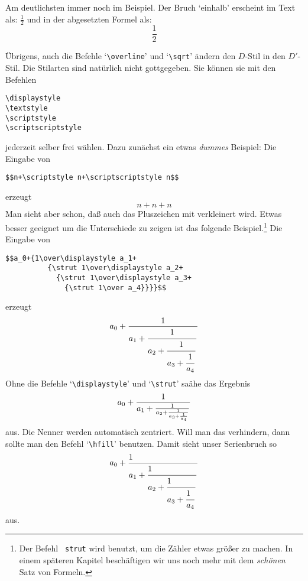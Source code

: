 Am deutlichsten immer noch im Beispiel. Der 
Bruch `einhalb' erscheint
im Text als: $\frac{1}{2}$ und in der abgesetzten
Formel
als:\[\frac{1}{2}\]

\"Ubrigens, auch die Befehle 
`\verb|\overline|' und `\verb|\sqrt|'
\"andern den $D$-Stil in den $D'$-Stil. Die Stilarten sind nat\"urlich
nicht gottgegeben. Sie k\"onnen sie mit den Befehlen
\begin{verbatim}
\displaystyle
\textstyle
\scriptstyle
\scriptscriptstyle
\end{verbatim}
jederzeit selber frei w\"ahlen. Dazu zun\"achst ein etwas {\em dummes}
Beispiel: Die Eingabe von
\begin{verbatim}
$$n+\scriptstyle n+\scriptscriptstyle n$$
\end{verbatim}
erzeugt \[n+\scriptstyle n+\scriptscriptstyle n\]
Man sieht aber schon, da\ss{} auch das 
Pluszeichen mit verkleinert wird.
Etwas besser geeignet um die Unterschiede zu zeigen ist das folgende
Beispiel.\footnote{Der Befehl {\tt{} strut} wird benutzt, um die
Z\"ahler etwas gr\"o\ss{}er zu machen. In einem sp\"ateren Kapitel besch\"aftigen
wir uns noch mehr mit dem {\em sch\"onen} Satz von Formeln.} Die Eingabe
von
\begin{verbatim}
$$a_0+{1\over\displaystyle a_1+
          {\strut 1\over\displaystyle a_2+
            {\strut 1\over\displaystyle a_3+
              {\strut 1\over a_4}}}}$$
\end{verbatim}
erzeugt
\[a_0+{1\over\displaystyle a_1+
          {\strut 1\over\displaystyle a_2+
            {\strut 1\over\displaystyle a_3+
              {\strut 1\over a_4}}}}\]
Ohne die Befehle `\verb|\displaystyle|' und `\verb|\strut|' sa\"ahe das
Ergebnis
\[a_0+{1\over a_1+
          {1\over a_2+
            {1\over a_3+
              {1\over a_4}}}}\]
aus. Die 
Nenner werden automatisch 
zentriert. Will man das verhindern,
dann sollte man den Befehl
`\verb|\hfill|' benutzen. Damit sieht unser
Serienbruch so
\[a_0+{1\hfill\over\displaystyle a_1+
          {\strut 1\hfill\over\displaystyle a_2+
            {\strut 1\hfill\over\displaystyle a_3+
              {\strut 1\hfill\over a_4}}}}\]
aus.
